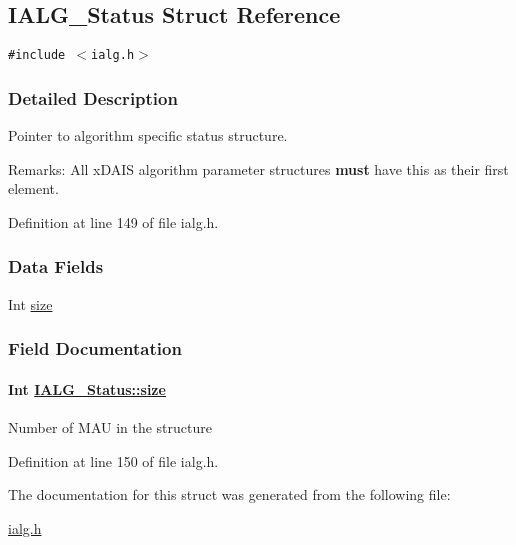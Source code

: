 \hypertarget{struct_i_a_l_g___status}{
\subsection{IALG\_\-Status Struct Reference}
\label{struct_i_a_l_g___status}
}
{\tt \#include $<$ialg.h$>$}



\subsubsection{Detailed Description}
Pointer to algorithm specific status structure. 

\begin{Desc}
\item[Remarks:]All x\-DAIS algorithm parameter structures {\bf must} have this as their first element. \end{Desc}




Definition at line 149 of file ialg.h.\subsubsection*{Data Fields}
\begin{CompactItemize}
\item 
Int \hyperlink{struct_i_a_l_g___status_852361d0183829e930a949268d9b0b02}{size}
\end{CompactItemize}


\subsubsection{Field Documentation}
\hypertarget{struct_i_a_l_g___status_852361d0183829e930a949268d9b0b02}{
\paragraph[size]{\setlength{\rightskip}{0pt plus 5cm}Int \hyperlink{struct_i_a_l_g___status_852361d0183829e930a949268d9b0b02}{IALG\_\-Status::size}}\hfill}
\label{struct_i_a_l_g___status_852361d0183829e930a949268d9b0b02}


Number of MAU in the structure 

Definition at line 150 of file ialg.h.

The documentation for this struct was generated from the following file:\begin{CompactItemize}
\item 
\hyperlink{ialg_8h}{ialg.h}\end{CompactItemize}
